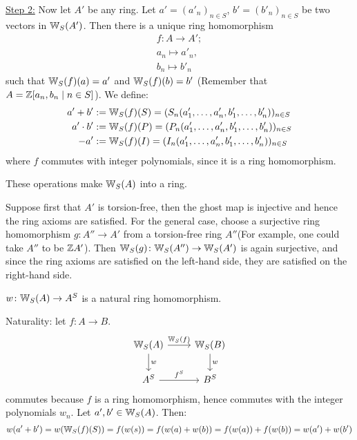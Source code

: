 \begin{bigproof}
    \underline{Step 2:} Now let $A'$ be any ring.
    Let $a' = (a'_n)_{n \in S}$, $b' = (b'_n)_{n \in S}$ be two vectors in $\mathbb{W}_S(A')$.
    Then there is a unique ring homomorphism
    \begin{align*}
        f \colon A \to A'; \\
        a_n \mapsto a'_n, \\
        b_n \mapsto b'_n
    \end{align*}
    such that $\mathbb{W}_S(f)(a) = a'$ and $\mathbb{W}_S(f)(b) = b'$
    (Remember that $A = \mathbb{Z}[a_n,b_n \mid n \in S]$).
    We define:
    \begin{align*}
        a'+ b' &:= \mathbb{W}_S(f)(S) 
        = (S_n(a'_1,\dots,a'_n,b'_1,\dots,b'_n))_{n \in S} \\
        a' \cdot b' &:= \mathbb{W}_S(f)(P) = (P_n(a'_1,\dots,a'_n,b'_1,\dots,b'_n))_{n \in S} \\
        -a' &:= \mathbb{W}_S(f)(I) = (I_n(a'_1,\dots,a'_n,b'_1,\dots,b'_n))_{n \in S}
    \end{align*}
    where $f$ commutes with integer polynomials, since it is a ring homomorphism.
\begin{claim*}
    These operations make $\mathbb{W}_S(A)$ into a ring.
\end{claim*}
\begin{smallproof}
    Suppose first that $A'$ is torsion-free, then the ghost map is injective
    and hence the ring axioms are satisfied.
    For the general case, choose a surjective ring homomorphism $g \colon A'' \to A'$
    from a torsion-free ring $A''$(For example, one could take $A''$ to be $\mathbb{Z} A'$).
    Then $\mathbb{W}_S (g)\colon \mathbb{W}_S(A'') \to \mathbb{W}_S(A')$ is again surjective, and since the
    ring axioms are satisfied on the left-hand side, they are satisfied on the right-hand side.
\end{smallproof}
\begin{claim*}
    $w \colon \mathbb{W}_S(A) \to A^S$ is a natural ring homomorphism.
\end{claim*}
Naturality: let $f \colon A \to B$.
\[
    \begin{tikzcd}
        \W_S(A) \arrow[r,"\W_S(f)"] \arrow[d,"w"] 
          & \W_S(B) \arrow[d,"w"] \\
        A^S \arrow[r,"f^S"]
          & B^S
    \end{tikzcd}
\]
commutes because $f$ is a ring homomorphism, hence commutes with the integer polynomials $w_n$.
Let $a',b' \in \mathbb{W}_S(A)$. Then: 
\begin{align*}
    w(a'+b') = w(\mathbb{W}_S(f)(S)) = f(w(s)) = f(w(a)+w(b)) = f(w(a)) + f(w(b)) = w(a') +w(b')
\end{align*}
\end{bigproof}
